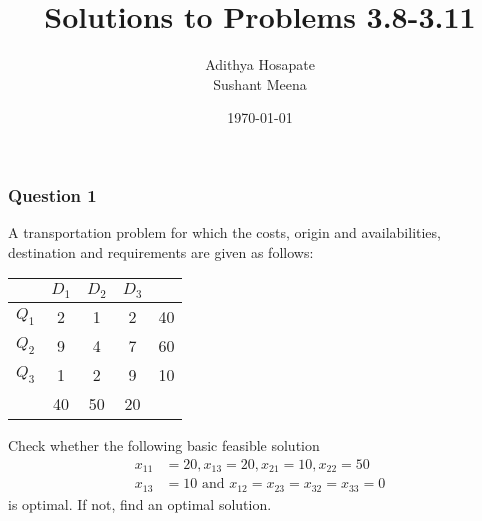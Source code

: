 \documentclass{beamer}
\title[3.8-3.11]{Solutions to  Problems 3.8-3.11} %
\author{Adithya Hosapate \\ Sushant Meena} %
\institute[IITH] %
{
IIT Hyderabad \\ %
\medskip
\textit{ee16btech11040@iith.ac.in} %
\medskip \\
\textit{es16btech11021@iith.ac.in}
}
\date{\today} %
\begin{document}
\begin{frame}
\titlepage %
\end{frame}






\begin{frame}
\frametitle{Question 1}


A transportation problem for which the costs, origin and availabilities, destination and requirements are given as follows: \\

\begin{center}
\begin{tabular}{c|c c c|c}
 & $D_1$ & $D_2$ & $D_3$\\ \hline
$Q_1$ & 2 & 1 & 2 & 40\\
$Q_2$ & 9 & 4 & 7 & 60\\
$Q_3$ & 1 & 2 & 9 & 10\\ \hline
 & 40 & 50 & 20\\
\end{tabular}
\end{center}
\bigskip
Check whether the following basic feasible solution
\begin{align*}
x_{11}&=20,x_{13}=20,x_{21}=10,x_{22}=50
\\
x_{13}&=10 \text{ and } x_{12}=x_{23}=x_{32}=x_{33}=0
\end{align*}
is optimal. If not, find an optimal solution.

\end{frame}




\end{document}
